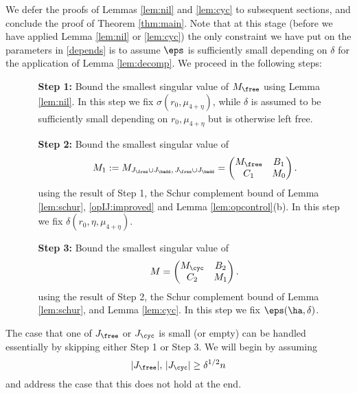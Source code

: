 \documentclass[aop,preprint]{imsart}
\theoremstyle{plain}
\theoremstyle{definition}
\theoremstyle{remark}
\numberwithin{equation}{section}
\numberwithin{theorem}{section}
\begin{document}
We defer the proofs of Lemmas \ref{lem:nil} and \ref{lem:cyc} to subsequent sections, and conclude the proof of Theorem \ref{thm:main}. 
Note that at this stage (before we have applied Lemma \ref{lem:nil} or \ref{lem:cyc}) the only constraint we have put on the parameters in \eqref{depends} is to assume $\eps$ is sufficiently small depending on $\delta$ for the application of Lemma \ref{lem:decomp}.
%
We proceed in the following steps:\\

\begin{itemize}
\item []
\begin{itemize}
\item [ {\bf Step 1:}] Bound the smallest singular value of $M_{\free}$ using Lemma \ref{lem:nil}. In this step we fix $\sigma(r_0,\mu_{4+\eta})$, while $\delta$ is assumed to be sufficiently small depending on $r_0,\mu_{4+\eta}$ but is otherwise left free.

\item [ {\bf Step 2:}] Bound the smallest singular value of 
\begin{equation}	\label{decompM1}
M_1 := M_{J_{\free}\cup J_{\badd},\,J_{\free}\cup J_{\badd}} = \begin{pmatrix} M_{\free} & B_1 \\ C_1 & M_0 \end{pmatrix}.
\end{equation}
using the result of Step 1, the Schur complement bound of Lemma \ref{lem:schur}, 
\eqref{opIJ:improved} and Lemma \ref{lem:opcontrol}(b).
%
In this step we fix $\delta(r_0,\eta,\mu_{4+\eta})$.
%

\item [ {\bf Step 3:}] Bound the smallest singular value of 
\begin{equation}	\label{decompM}
M= \begin{pmatrix} M_{\cyc} & B_2\\ C_2 & M_1\end{pmatrix}.
\end{equation}
using the result of Step 2, the Schur complement bound of Lemma \ref{lem:schur}, and Lemma \ref{lem:cyc}.
In this step we fix $\eps(\ha,\delta)$.
\end{itemize}
\end{itemize}

The case that one of $J_{\free}$ or $J_{\cyc}$ is small (or empty) can be handled essentially by skipping either Step 1 or Step 3. 
We will begin by assuming
\begin{equation}	\label{LB:nilcyc}
|J_{\free}|,\, |J_{\cyc}| \ge \delta^{1/2}n
\end{equation}
and address the case that this does not hold at the end.
\end{document}
